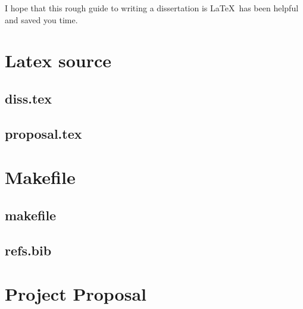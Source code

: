 \documentclass[12pt,a4paper,twoside,openright]{report}
\begin{document}
I hope that this rough guide to writing a dissertation is \LaTeX\ has
been helpful and saved you time.




\appendix

\chapter{Latex source}

\section{diss.tex}
{\scriptsize}

\section{proposal.tex}
{\scriptsize}

\chapter{Makefile}

\section{makefile}\label{makefile}
{\scriptsize}

\section{refs.bib}
{\scriptsize}


\chapter{Project Proposal}


\end{document}

